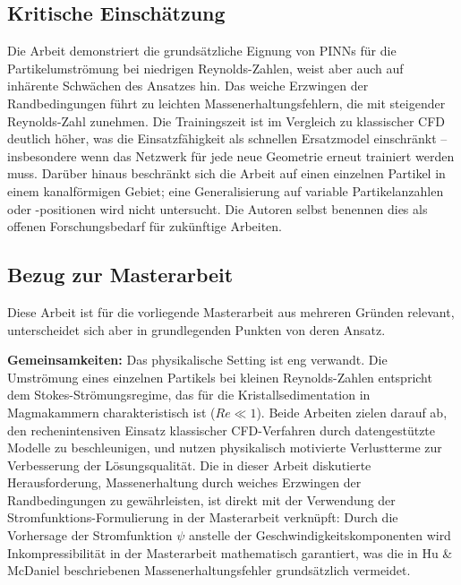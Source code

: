 \documentclass[a4paper,12pt]{article}
\begin{document}
\subsection*{Kritische Einschätzung}

Die Arbeit demonstriert die grundsätzliche Eignung von PINNs für die
Partikelumströmung bei niedrigen Reynolds-Zahlen, weist aber auch auf
inhärente Schwächen des Ansatzes hin. Das weiche Erzwingen der
Randbedingungen führt zu leichten Massenerhaltungsfehlern, die mit
steigender Reynolds-Zahl zunehmen. Die Trainingszeit ist im Vergleich zu
klassischer CFD deutlich höher, was die Einsatzfähigkeit als schnellen
Ersatzmodel einschränkt -- insbesondere wenn das Netzwerk für jede neue
Geometrie erneut trainiert werden muss. Darüber hinaus beschränkt sich die
Arbeit auf einen einzelnen Partikel in einem kanalförmigen Gebiet; eine
Generalisierung auf variable Partikelanzahlen oder -positionen wird nicht
untersucht. Die Autoren selbst benennen dies als offenen Forschungsbedarf
für zukünftige Arbeiten.

\subsection*{Bezug zur Masterarbeit}

Diese Arbeit ist für die vorliegende Masterarbeit aus mehreren Gründen
relevant, unterscheidet sich aber in grundlegenden Punkten von deren Ansatz.

\textbf{Gemeinsamkeiten:} Das physikalische Setting ist eng verwandt. Die
Umströmung eines einzelnen Partikels bei kleinen Reynolds-Zahlen entspricht
dem Stokes-Strömungsregime, das für die Kristallsedimentation in Magmakammern
charakteristisch ist ($Re \ll 1$). Beide Arbeiten zielen darauf ab, den
rechenintensiven Einsatz klassischer CFD-Verfahren durch datengestützte
Modelle zu beschleunigen, und nutzen physikalisch motivierte Verlustterme
zur Verbesserung der Lösungsqualität. Die in dieser Arbeit diskutierte
Herausforderung, Massenerhaltung durch weiches Erzwingen der
Randbedingungen zu gewährleisten, ist direkt mit der Verwendung der
Stromfunktions-Formulierung in der Masterarbeit verknüpft: Durch die
Vorhersage der Stromfunktion $\psi$ anstelle der Geschwindigkeitskomponenten
wird Inkompressibilität in der Masterarbeit mathematisch garantiert, was die
in Hu \& McDaniel beschriebenen Massenerhaltungsfehler grundsätzlich vermeidet.
\end{document}
